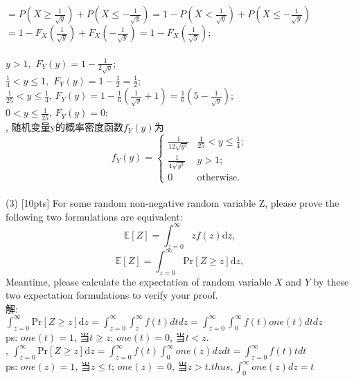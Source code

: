 \documentclass{article}
\begin{document}
\indent$=P(X\geq \frac{1}{\sqrt y})+P(X\leq -\frac{1}{\sqrt y})=1-P(X< \frac{1}{\sqrt y})+P(X\leq -\frac{1}{\sqrt y})$\\
\indent$=1-F_X(\frac{1}{\sqrt y})+F_X(-\frac{1}{\sqrt y})=1-F_X(\frac{1}{\sqrt y})$;\\\\
$y>1,$ $F_Y(y)=1-\frac{1}{2\sqrt y}$;\\
$\frac{1}{4}<y\leq1,$ $F_Y(y)=1-\frac{1}{2}=\frac{1}{2}$;\\
$\frac{1}{25}<y\leq \frac{1}{4}$, $F_Y(y)=1-\frac{1}{6}(\frac{1}{\sqrt y}+1)=\frac{1}{6}(5-\frac{1}{\sqrt y}) $;\\
$0<y\leq \frac{1}{25}$, $F_Y(y)=0$;\\
, 随机变量y的概率密度函数$f_Y(y)$为\\
		\begin{equation}
		f_Y(y)=\begin{cases}
			\frac{1}{12\sqrt {y^3}}&\frac{1}{25}<y\leq \frac{1}{4};\\
			\frac{1}{4\sqrt{y^3}}&y>1;\\
			0 & \text{otherwise}.
		\end{cases}
		\end{equation}
\\
	(3) [10pts] For some random non-negative random variable Z, please prove the following two formulations are equivalent:\\
	\begin{equation}
	\mathbb{E}[Z]=\int^\infty_{z=0} z f(z)\mathrm{d}z,
	\end{equation}
	\begin{equation}
	\mathbb{E}[Z]=\int^\infty_{z=0} \mathrm{Pr}[Z\geq z]\mathrm{d}z,
	\end{equation}
	Meantime, please calculate the expectation of random variable $X$ and $Y$ by these two expectation formulations to verify your proof.\\
解:\\
\indent$\int^\infty_{z=0} \mathrm{Pr}[Z\geq z]\mathrm{d}z=\int_{z=0}^\infty \int_{z}^\infty f(t)dtdz=\int_{z=0}^\infty \int_{0}^\infty f(t)one(t)dtdz$\\
\indent ps: $one(t)=1$, 当$t\geq z$; $one(t)=0$, 当$t<z$.\\
, $\int^\infty_{z=0} \mathrm{Pr}[Z\geq z]\mathrm{d}z=\int_{z=0}^\infty f(t)\int_{0}^\infty one(z)dzdt=\int_{z=0}^\infty f(t)tdt$\\
\indent ps: $one(z)=1$, 当$z\leq t$; $one(z)=0$, 当$z>t.thus,\int_{0}^\infty one(z)dz=t$\\
\end{document}
